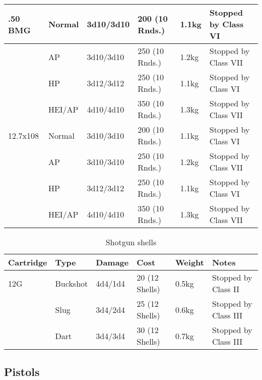 \begin{table}
\begin{center}
\begin{tabular}{| l | l | l | l | l | l |}
      .50 BMG  & Normal  & 3d10/3d10  & 200 (10 Rnds.) & 1.1kg & Stopped by Class VI \\ \hline
      \,       & AP      & 3d10/3d10  & 250 (10 Rnds.) & 1.2kg & Stopped by Class VII \\ \hline
      \,       & HP      & 3d12/3d12  & 250 (10 Rnds.) & 1.1kg & Stopped by Class VI \\ \hline
      \,       & HEI/AP  & 4d10/4d10  & 350 (10 Rnds.) & 1.3kg & Stopped by Class VII \\ \hline
      12.7x108 & Normal  & 3d10/3d10  & 200 (10 Rnds.) & 1.1kg & Stopped by Class VI \\ \hline
      \,       & AP      & 3d10/3d10  & 250 (10 Rnds.) & 1.2kg & Stopped by Class VII \\ \hline
      \,       & HP      & 3d12/3d12  & 250 (10 Rnds.) & 1.1kg & Stopped by Class VI \\ \hline
      \,       & HEI/AP  & 4d10/4d10  & 350 (10 Rnds.) & 1.3kg & Stopped by Class VII \\ \hline

    \end{tabular}
  \end{center}
\end{table}

\begin{table}
  \caption{Shotgun shells}
  \label{tab:ShotgunShells}
  \begin{center}
    \begin{tabular}{| l | l | l | l | l | l |}
      \hline
      \textbf{Cartridge}  & \textbf{Type}   & \textbf{Damage} &
      \textbf{Cost} & \textbf{Weight} & \textbf{Notes}        \\ \hline

      12G     & Buckshot & 4d4/1d4 & 20 (12 Shells) & 0.5kg & Stopped by Class II \\ \hline
      \,      & Slug     & 3d4/2d4 & 25 (12 Shells) & 0.6kg & Stopped by Class III \\ \hline
      \,      & Dart     & 3d4/3d4 & 30 (12 Shells) & 0.7kg & Stopped by Class III \\ \hline

    \end{tabular}
  \end{center}
\end{table}

\subsection{Pistols}
\label{sub:10-Pistols}

